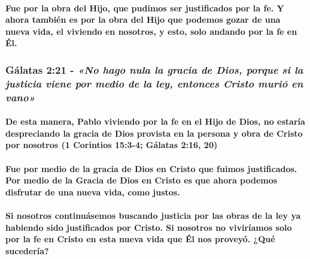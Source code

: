 \documentclass[11a pt,twoside]{article}
\newcommand{\scripture}[1]{%
  {\fontsize{12pt}{16pt}\selectfont\ScriptureFont\itshape #1}%
}
\let\oldsubsubsection\subsubsection
\renewcommand{\subsubsection}{\needspace{4\baselineskip}\oldsubsubsection}
\let\oldparagraph\paragraph
\renewcommand{\paragraph}{\needspace{3\baselineskip}\oldparagraph}
\begin{document}
\paragraph{Fue por la obra del Hijo, que pudimos ser justificados por la
fe. Y ahora también es por la obra del Hijo que podemos gozar de una
nueva vida, el viviendo en nosotros, y esto, solo andando por la fe en
Él.}\label{fue-por-la-obra-del-hijo-que-pudimos-ser-justificados-por-la-fe.-y-ahora-tambiuxe9n-es-por-la-obra-del-hijo-que-podemos-gozar-de-una-nueva-vida-el-viviendo-en-nosotros-y-esto-solo-andando-por-la-fe-en-uxe9l.}

\subsubsection{\texorpdfstring{Gálatas 2:21 -
\scripture{«No hago nula la gracia de Dios, porque si la justicia viene por medio de la ley, entonces Cristo murió en vano»}}{Gálatas 2:21 - }}\label{guxe1latas-221---no-hago-nula-la-gracia-de-dios-porque-si-la-justicia-viene-por-medio-de-la-ley-entonces-cristo-muriuxf3-en-vano}

\paragraph{De esta manera, Pablo viviendo por la fe en el Hijo de Dios,
no estaría despreciando la gracia de Dios provista en la persona y obra
de Cristo por nosotros (1 Corintios 15:3-4; Gálatas 2:16,
20)}\label{de-esta-manera-pablo-viviendo-por-la-fe-en-el-hijo-de-dios-no-estaruxeda-despreciando-la-gracia-de-dios-provista-en-la-persona-y-obra-de-cristo-por-nosotros-1-corintios-153-4-guxe1latas-216-20}

\paragraph{Fue por medio de la gracia de Dios en Cristo que fuimos
justificados. Por medio de la Gracia de Dios en Cristo es que ahora
podemos disfrutar de una nueva vida, como
justos.}\label{fue-por-medio-de-la-gracia-de-dios-en-cristo-que-fuimos-justificados.-por-medio-de-la-gracia-de-dios-en-cristo-es-que-ahora-podemos-disfrutar-de-una-nueva-vida-como-justos.}

\paragraph{Si nosotros continuásemos buscando justicia por las obras de
la ley ya habiendo sido justificados por Cristo. Si nosotros no
viviríamos solo por la fe en Cristo en esta nueva vida que Él nos
proveyó. ¿Qué
sucedería?}\label{si-nosotros-continuuxe1semos-buscando-justicia-por-las-obras-de-la-ley-ya-habiendo-sido-justificados-por-cristo.-si-nosotros-no-viviruxedamos-solo-por-la-fe-en-cristo-en-esta-nueva-vida-que-uxe9l-nos-proveyuxf3.-quuxe9-sucederuxeda}
\end{document}
